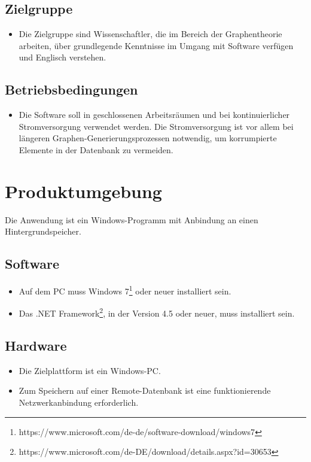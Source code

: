 \documentclass[13pt]{scrreprt}
\begin{document}
\section{Zielgruppe}
	\begin{itemize}[label={}]
	\item{Die Zielgruppe sind Wissenschaftler, die im Bereich der Graphentheorie arbeiten, über grundlegende Kenntnisse im Umgang mit Software verfügen und Englisch verstehen.}
	\end{itemize}

\section{Betriebsbedingungen}
	\begin{itemize}[label={}]
	\item{Die Software soll in geschlossenen Arbeitsräumen und bei kontinuierlicher Stromversorgung verwendet werden. Die Stromversorgung ist vor allem bei längeren Graphen-Generierungsprozessen notwendig, um korrumpierte Elemente in der Datenbank zu vermeiden.}
	\end{itemize}



\chapter{Produktumgebung}

Die Anwendung ist ein Windows-Programm mit Anbindung an einen Hintergrundspeicher.

\section{Software}
\begin{itemize}
	\item{Auf dem PC muss Windows 7\footnote{https://www.microsoft.com/de-de/software-download/windows7} oder neuer installiert sein.}
	\item{Das .NET Framework\footnote{https://www.microsoft.com/de-DE/download/details.aspx?id=30653}, in der Version 4.5 oder neuer, muss installiert sein.}
\end{itemize}

\section{Hardware}
\begin{itemize}
	\item{Die Zielplattform ist ein Windows-PC.}
	\item{Zum Speichern auf einer Remote-Datenbank ist eine funktionierende Netzwerkanbindung erforderlich.}
\end{itemize}
\end{document}
